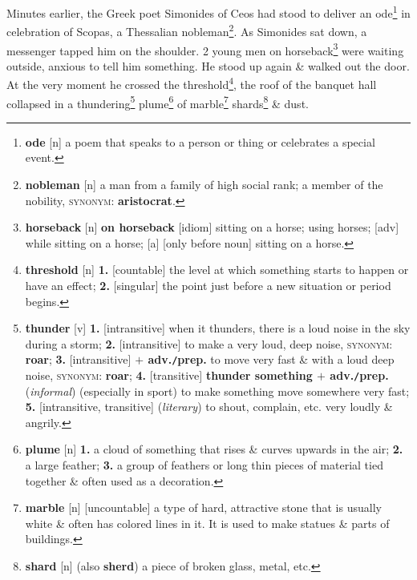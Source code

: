 \documentclass[oneside]{book}
\numberwithin{equation}{section}
\begin{document}
Minutes earlier, the Greek poet Simonides of Ceos had stood to deliver an ode\footnote{\textbf{ode} [n] a poem that speaks to a person or thing or celebrates a special event.} in celebration of Scopas, a Thessalian nobleman\footnote{\textbf{nobleman} [n] a man from a family of high social rank; a member of the nobility, \textsc{synonym}: \textbf{aristocrat}.}. As Simonides sat down, a messenger tapped him on the shoulder. 2 young men on horseback\footnote{\textbf{horseback} [n] \textbf{on horseback} [idiom] sitting on a horse; using horses; [adv] while sitting on a horse; [a] [only before noun] sitting on a horse.} were waiting outside, anxious to tell him something. He stood up again \& walked out the door. At the very moment he crossed the threshold\footnote{\textbf{threshold} [n] \textbf{1.} [countable] the level at which something starts to happen or have an effect; \textbf{2.} [singular] the point just before a new situation or period begins.}, the roof of the banquet hall collapsed in a thundering\footnote{\textbf{thunder} [v] \textbf{1.} [intransitive] when it thunders, there is a loud noise in the sky during a storm; \textbf{2.} [intransitive] to make a very loud, deep noise, \textsc{synonym}: \textbf{roar}; \textbf{3.} [intransitive] \textbf{$+$ adv.\texttt{/}prep.} to move very fast \& with a loud deep noise, \textsc{synonym}: \textbf{roar}; \textbf{4.} [transitive] \textbf{thunder something $+$ adv.\texttt{/}prep.} (\textit{informal}) (especially in sport) to make something move somewhere very fast; \textbf{5.} [intransitive, transitive] (\textit{literary}) to shout, complain, etc. very loudly \& angrily.} plume\footnote{\textbf{plume} [n] \textbf{1.} a cloud of something that rises \& curves upwards in the air; \textbf{2.} a large feather; \textbf{3.} a group of feathers or long thin pieces of material tied together \& often used as a decoration.} of marble\footnote{\textbf{marble} [n] [uncountable] a type of hard, attractive stone that is usually white \& often has colored lines in it. It is used to make statues \& parts of buildings.} shards\footnote{\textbf{shard} [n] (also \textbf{sherd}) a piece of broken glass, metal, etc.} \& dust.
\end{document}
